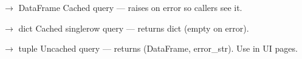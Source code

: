 \documentclass[letterpaper,10pt,english]{sphinxmanual}
\begin{document}

\begin{fulllineitems}
\label{\detokenize{gui.db:gui.db.q}}
\pysigstartsignatures
\pysiglinewithargsret
{}
{\sphinxparamcomma {}}
{{ $\rightarrow$ DataFrame}}
\pysigstopsignatures
\sphinxAtStartPar
Cached query — raises on error so callers see it.

\end{fulllineitems}


\begin{fulllineitems}
\label{\detokenize{gui.db:gui.db.q1}}
\pysigstartsignatures
\pysiglinewithargsret
{}
{\sphinxparamcomma {}}
{{ $\rightarrow$ dict}}
\pysigstopsignatures
\sphinxAtStartPar
Cached single\sphinxhyphen{}row query — returns dict (empty on error).

\end{fulllineitems}


\begin{fulllineitems}
\label{\detokenize{gui.db:gui.db.q_safe}}
\pysigstartsignatures
\pysiglinewithargsret
{}
{\sphinxparamcomma {}}
{{ $\rightarrow$ tuple}}
\pysigstopsignatures
\sphinxAtStartPar
Uncached query — returns (DataFrame, error\_str). Use in UI pages.

\end{fulllineitems}


\sphinxstepscope
\end{document}
